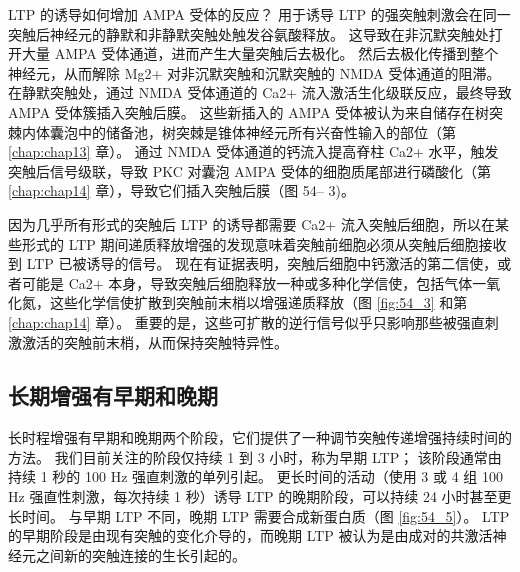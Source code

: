 LTP 的诱导如何增加 AMPA 受体的反应？ 用于诱导 LTP 的强突触刺激会在同一突触后神经元的静默和非静默突触处触发谷氨酸释放。 这导致在非沉默突触处打开大量 AMPA 受体通道，进而产生大量突触后去极化。 然后去极化传播到整个神经元，从而解除 Mg2+ 对非沉默突触和沉默突触的 NMDA 受体通道的阻滞。 在静默突触处，通过 NMDA 受体通道的 Ca2+ 流入激活生化级联反应，最终导致 AMPA 受体簇插入突触后膜。 这些新插入的 AMPA 受体被认为来自储存在树突棘内体囊泡中的储备池，树突棘是锥体神经元所有兴奋性输入的部位（第 \ref{chap:chap13} 章）。 通过 NMDA 受体通道的钙流入提高脊柱 Ca2+ 水平，触发突触后信号级联，导致 PKC 对囊泡 AMPA 受体的细胞质尾部进行磷酸化（第 \ref{chap:chap14} 章），导致它们插入突触后膜（图 54– 3)。

因为几乎所有形式的突触后 LTP 的诱导都需要 Ca2+ 流入突触后细胞，所以在某些形式的 LTP 期间递质释放增强的发现意味着突触前细胞必须从突触后细胞接收到 LTP 已被诱导的信号。 现在有证据表明，突触后细胞中钙激活的第二信使，或者可能是 Ca2+ 本身，导致突触后细胞释放一种或多种化学信使，包括气体一氧化氮，这些化学信使扩散到突触前末梢以增强递质释放（图 \ref{fig:54_3} 和第 \ref{chap:chap14} 章）。 重要的是，这些可扩散的逆行信号似乎只影响那些被强直刺激激活的突触前末梢，从而保持突触特异性。

\subsection{长期增强有早期和晚期}
长时程增强有早期和晚期两个阶段，它们提供了一种调节突触传递增强持续时间的方法。 我们目前关注的阶段仅持续 1 到 3 小时，称为早期 LTP； 该阶段通常由持续 1 秒的 100 Hz 强直刺激的单列引起。 更长时间的活动（使用 3 或 4 组 100 Hz 强直性刺激，每次持续 1 秒）诱导 LTP 的晚期阶段，可以持续 24 小时甚至更长时间。 与早期 LTP 不同，晚期 LTP 需要合成新蛋白质（图 \ref{fig:54_5}）。 LTP 的早期阶段是由现有突触的变化介导的，而晚期 LTP 被认为是由成对的共激活神经元之间新的突触连接的生长引起的。

